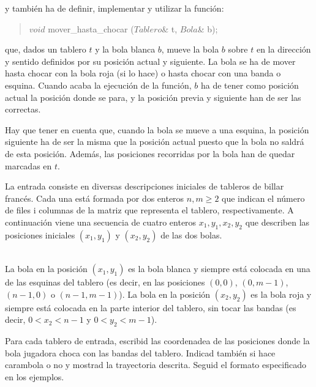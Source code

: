 y también ha de definir, implementar y utilizar la función:

\begin{quote}
 $void$ mover\_hasta\_chocar ($Tablero$\& t, $Bola$\& b); 
\end{quote}

que, dados un tablero $t$ y la bola blanca $b$,  
mueve la bola $b$ sobre $t$ en la dirección y sentido definidos por su posición actual y siguiente. La bola se ha de mover hasta chocar con la bola roja (si lo hace) o hasta chocar con una banda o esquina. Cuando acaba la ejecución de la función, $b$  ha de tener como posición actual la posición donde se para, y la posición previa y siguiente han de ser las correctas. 
   
Hay que tener en cuenta que, cuando la bola se mueve a una esquina, la posición siguiente ha de ser la misma que la posición actual puesto que la bola no saldrá de esta posición. Además, las posiciones recorridas por la bola han de quedar marcadas en $t$. 




\Input

La entrada consiste en diversas descripciones iniciales de tableros de billar francés. Cada una está formada por dos enteros $n, m \geq 2$ que indican el número de files i columnas de la matriz que representa el tablero, respectivamente. A continuación viene una secuencia de cuatro enteros $x_1, y_1, x_2, y_2$ que describen las posiciones iniciales $(x_1, y_1)$ y $(x_2, y_2)$ de las dos bolas. 

\ \\
La bola en la posición $(x_1, y_1)$ es la bola blanca y  siempre está colocada en una de las esquinas del tablero (es decir, en las posiciones $(0,0)$, 
$(0, m - 1)$, $(n - 1, 0)$ o $(n - 1, m - 1)$). La bola en la posición $(x_2,y_2)$ es la bola roja y siempre está colocada en la parte interior del tablero, sin tocar las bandas (es decir, $0<x_2<n-1$ y $0<y_2<m-1$).


\Output

Para cada tablero de entrada, escribid las coordenadea de las posiciones donde la bola jugadora choca con las bandas del tablero. Indicad también si hace carambola o no y mostrad la trayectoria descrita. Seguid el formato especificado en los ejemplos. 

\medskip



\Sample

